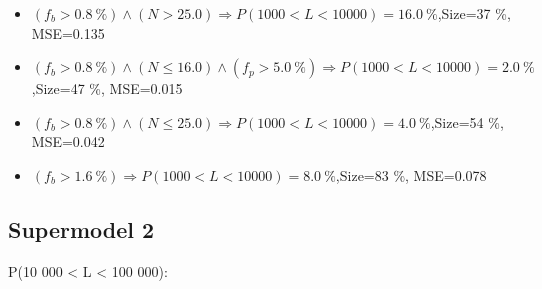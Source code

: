 \documentclass[numbered]{CSL}
\begin{document}
\begin{itemize}
\item $(f_b > 0.8~\%) \land (N > 25.0) \Rightarrow P(1 000 < L < 10 000) = 16.0~\%$,\hfill Size=37 \%, MSE=0.135
\item $(f_b > 0.8~\%) \land (N \leq 16.0) \land (f_p > 5.0~\%) \Rightarrow P(1 000 < L < 10 000) = 2.0~\%$,\hfill Size=47 \%, MSE=0.015
\item $(f_b > 0.8~\%) \land (N \leq 25.0) \Rightarrow P(1 000 < L < 10 000) = 4.0~\%$,\hfill Size=54 \%, MSE=0.042
\item $(f_b > 1.6~\%) \Rightarrow P(1 000 < L < 10 000) = 8.0~\%$,\hfill Size=83 \%, MSE=0.078
\end{itemize}

\subsection{Supermodel 2}
P(10 000 < L < 100 000):
\end{document}
